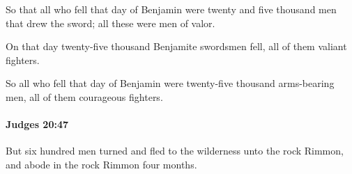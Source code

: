 			\begin{versebox}
					\item[BHS] 
					\item[ASV] So that all who fell that day of Benjamin were twenty and five thousand men that drew the sword; all these were men of valor.
					\item[NIV] On that day twenty-five thousand Benjamite swordsmen fell, all of them valiant fighters.
					\item[NRSV] So all who fell that day of Benjamin were twenty-five thousand arms-bearing men, all of them courageous fighters.
			\end{versebox}

		\paragraph{Judges 20:47} %
			\label{JUDGES-20-47}

			But six hundred men turned and fled to the wilderness unto the rock Rimmon, and abode in the rock Rimmon four months.

